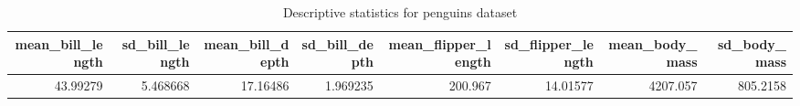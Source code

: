 \begin{table}

\caption{Descriptive statistics for penguins dataset}
\centering
\begin{tabular}[t]{r|r|r|r|r|r|r|r}
\hline
mean\_bill\_length & sd\_bill\_length & mean\_bill\_depth & sd\_bill\_depth & mean\_flipper\_length & sd\_flipper\_length & mean\_body\_mass & sd\_body\_mass\\
\hline
43.99279 & 5.468668 & 17.16486 & 1.969235 & 200.967 & 14.01577 & 4207.057 & 805.2158\\
\hline
\end{tabular}
\end{table}